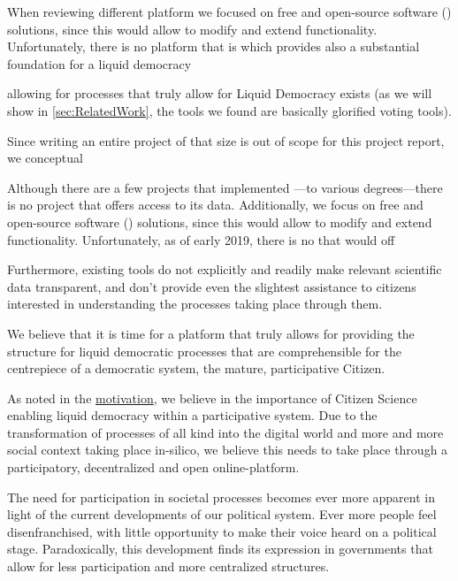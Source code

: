 When reviewing different platform we focused on free and open-source software () solutions, since this would allow to modify and extend functionality. Unfortunately, there is no platform that is  which provides also a substantial foundation for a liquid democracy

allowing for processes that truly allow for Liquid Democracy exists (as we will show in \ref{sec:RelatedWork}, the tools we found are basically glorified voting tools). 

Since writing an entire project of that size is out of scope for this project report, we conceptual

Although there are a few projects that implemented ---to various degrees---there is no project that offers access to its data. Additionally, we focus on free and open-source software () solutions, since this would allow to modify and extend functionality. Unfortunately, as of early 2019, there is no  that would off


Furthermore, existing tools do not explicitly and readily make relevant scientific data transparent, and don't provide even the slightest assistance to citizens interested in understanding the processes taking place through them. 

We believe that it is time for a platform that truly allows for providing the structure for liquid democratic processes that are comprehensible for the centrepiece of a democratic system, the mature, participative Citizen.


As noted in the \hyperref[sec:Motivation]{motivation}, we believe in the importance of Citizen Science enabling liquid democracy within a participative system. Due to the transformation of processes of all kind into the digital world and more and more social context taking place in-silico, we believe this needs to take place through a participatory, decentralized and open online-platform.

The need for participation in societal processes becomes ever more apparent in light of the current developments of our political system. Ever more people feel disenfranchised, with little opportunity to make their voice heard on a political stage. Paradoxically, this development finds its expression in governments that allow for less participation and more centralized structures.

